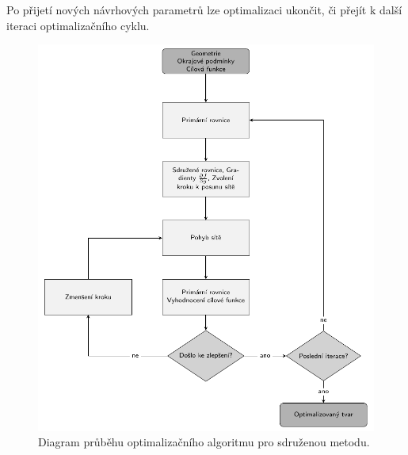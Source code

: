 Po přijetí nových návrhových parametrů lze optimalizaci ukončit, či přejít k další iteraci optimalizačního cyklu.
\vfill
\newpage
\begin{figure}[H]
	\includegraphics[width=\columnwidth]{./img/flowchart/optimalizacni_cyklus.pdf}
	\caption[Optimalizační cyklus]{Diagram průběhu optimalizačního algoritmu pro sdruženou metodu.}
	\label{fig:flowchart_opt_cyklus}
\end{figure}

